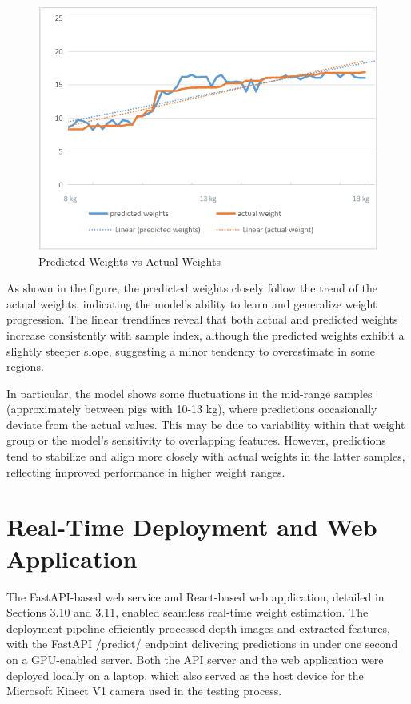 \begin{figure}[h]
	\centering
	\includegraphics[height=0.5\textheight]{figures/Predicted vs Actual Weights}
	\caption{Predicted Weights vs Actual Weights}
	\label{fig:Predicted vs Actual Weights}
\end{figure}

As shown in the figure, the predicted weights closely follow the trend of the actual weights, indicating the model's ability to learn and generalize weight progression. The linear trendlines reveal that both actual and predicted weights increase consistently with sample index, although the predicted weights exhibit a slightly steeper slope, suggesting a minor tendency to overestimate in some regions.

In particular, the model shows some fluctuations in the mid-range samples (approximately between pigs with 10-13 kg), where predictions occasionally deviate from the actual values. This may be due to variability within that weight group or the model’s sensitivity to overlapping features. However, predictions tend to stabilize and align more closely with actual weights in the latter samples, reflecting improved performance in higher weight ranges.

\section{Real-Time Deployment and Web Application}

The FastAPI-based web service and React-based web application, detailed in \hyperref[Section 3.10]{Sections 3.10 and 3.11}, enabled seamless real-time weight estimation. The deployment pipeline efficiently processed depth images and extracted features, with the FastAPI /predict/ endpoint delivering predictions in under one second on a GPU-enabled server. Both the API server and the web application were deployed locally on a laptop, which also served as the host device for the Microsoft Kinect V1 camera used in the testing process.


